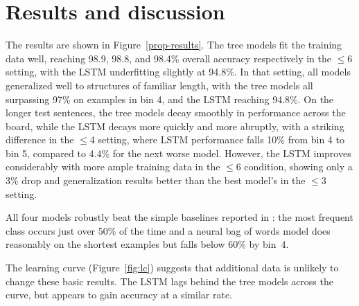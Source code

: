 
\section{Results and discussion}\label{sec:discussion}

The results are shown in Figure~\ref{prop-results}. 
The tree models fit the training data well, reaching 98.9, 98.8, and 98.4\% overall accuracy respectively in the $\le$6 setting, with the LSTM underfitting slightly at 94.8\%. 
In that setting, all models generalized well to structures of familiar length, with the tree models all surpassing 97\% on examples in bin 4, and the LSTM reaching 94.8\%.
On the longer test sentences, the tree models decay smoothly in performance across the board, while the LSTM decays more quickly and more abruptly, with a striking difference in the $\le$4 setting, where LSTM performance falls 10\% from bin 4 to bin 5, compared to 4.4\% for the next worse model. However, the LSTM improves considerably with more ample training data in the $\le$6 condition, showing only a 3\% drop and generalization results better than the best model's in the $\le$3 setting.

All four models robustly beat the simple baselines reported in : the most frequent class occurs just over 50\% of the time and a neural bag of words model does reasonably on the shortest examples but falls below 60\% by bin~4.

The learning curve (Figure~\ref{fig:lc}) suggests that additional data is unlikely to change these basic results. The LSTM lags behind the tree models across the curve, but appears to gain accuracy at a similar rate.


